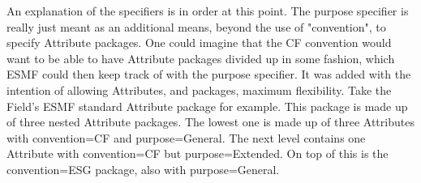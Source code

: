 An explanation of the specifiers is in order at this point.  The purpose 
specifier is really just meant as an additional means, beyond the use of 
"convention", to specify Attribute packages.  One could imagine that the 
CF convention would want to be able to have Attribute packages divided 
up in some fashion, which ESMF could then keep track of with the purpose 
specifier.  It was added with the intention of allowing Attributes, and 
packages, maximum flexibility.  Take the Field's ESMF standard Attribute 
package for example.  This 
package is made up of three nested Attribute packages.  The lowest one 
is made up of three Attributes with convention=CF and purpose=General.  
The next level contains one Attribute with convention=CF but 
purpose=Extended.  On top of this is the convention=ESG package, also 
with purpose=General.
